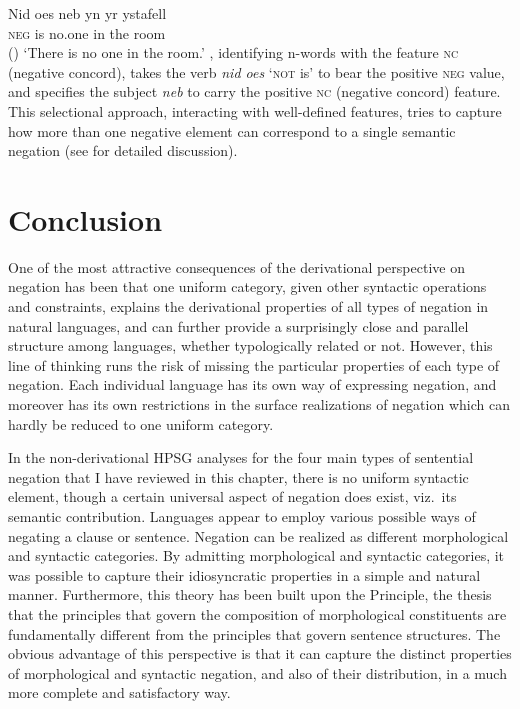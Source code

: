 \documentclass[output=paper
 	        ,biblatex
                ,babelshorthands
                ,newtxmath
                ,draftmode
                ,colorlinks, citecolor=brown
]{langscibook}
\begin{document}
\begin{exe}
\begin{xlist}
\begin{exe}
\begin{xlist}
\ea
\gll Nid         oes neb yn yr ystafell\\
\textsc{neg}    is no.one in the room\\\hfill()
\glt `There is no one in the room.'
\z
\noindent \citet{BJ:00}, identifying n-words with the feature
\textsc{nc} (negative
concord),  takes the verb \emph{nid oes} `\textsc{not} is' to bear the positive \textsc{neg} value,
and specifies the subject \emph{neb} to carry the positive \textsc{nc} (negative
concord) feature. This selectional approach, interacting with
well-defined features, tries to capture how more than one
negative element can correspond to a single semantic negation (see
\citealt{BJ:00} for detailed discussion).



\section{Conclusion}

One of the most attractive consequences of the derivational perspective on negation has been that
one uniform category, given other syntactic operations and constraints, explains the derivational
properties of all types of negation in natural languages, and can further provide a surprisingly
close and parallel structure among languages, whether typologically related or not. However, this
line of thinking runs the risk of missing the particular properties of each type of negation. Each
individual language has its own way of expressing negation, and moreover has its own restrictions in
the surface realizations of negation which can hardly be reduced to one uniform category.


In the non-derivational HPSG analyses for the four main types of sentential negation that I have
reviewed in this chapter, there is no uniform syntactic element, though a certain universal aspect
of negation does exist, viz.\ its semantic contribution.  Languages appear to employ various
possible ways of negating a clause or sentence. Negation can be realized as different morphological
and syntactic categories.  By admitting morphological and syntactic categories, it was possible to capture their idiosyncratic properties in a simple and natural manner. Furthermore, this theory has
been built upon the  Principle, the thesis that the principles that govern the
composition of morphological constituents are fundamentally different from the principles that
govern sentence structures. The obvious advantage of this perspective is that it can capture the
distinct properties of morphological and syntactic negation, and also of their distribution, in a
much more complete and satisfactory way.


\end{xlist}
\end{exe}
\end{xlist}
\end{exe}
\end{document}
